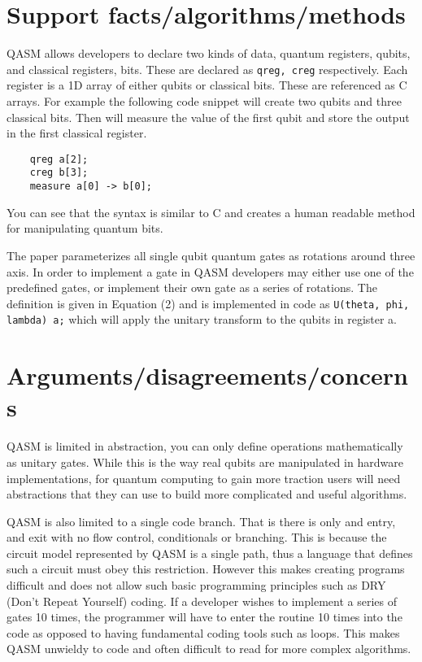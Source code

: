 \documentclass{article}
\begin{document}
\section{Support facts/algorithms/methods}

QASM allows developers to declare two kinds of data, quantum registers, qubits, and classical registers, bits. These are declared as \lstinline{qreg, creg} respectively. Each register is a 1D array of either qubits or classical bits. These are referenced as C arrays. For example the following code snippet will create two qubits and three classical bits. Then will measure the value of the first qubit and store the output in the first classical register.
\begin{lstlisting}
    qreg a[2];
    creg b[3];
    measure a[0] -> b[0];
\end{lstlisting}
You can see that the syntax is similar to C and creates a human readable method for manipulating quantum bits.

The paper parameterizes all single qubit quantum gates as rotations around three axis. In order to implement a gate in QASM developers may either use one of the predefined gates, or implement their own gate as a series of rotations. The definition is given in Equation (2) and is implemented in code as \lstinline{U(theta, phi, lambda) a;} which will apply the unitary transform to the qubits in register a.

\section{Arguments/disagreements/concerns}

QASM is limited in abstraction, you can only define operations mathematically as unitary gates. While this is the way real qubits are manipulated in hardware implementations, for quantum computing to gain more traction users will need abstractions that they can use to build more complicated and useful algorithms.

QASM is also limited to a single code branch. That is there is only and entry, and exit with no flow control, conditionals or branching. This is because the circuit model represented by QASM is a single path, thus a language that defines such a circuit must obey this restriction. However this makes creating programs difficult and does not allow such basic programming principles such as DRY (Don't Repeat Yourself) coding. If a developer wishes to implement a series of gates 10 times, the programmer will have to enter the routine 10 times into the code as opposed to having fundamental coding tools such as loops. This makes QASM unwieldy to code and often difficult to read for more complex algorithms.
\end{document}
